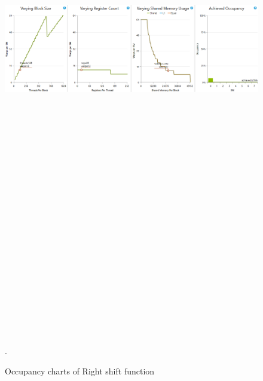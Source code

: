 \documentclass[oneside,openright,12pt,final,en]{mgr}
\begin{document}
\begin{figure}[H]
	\centering
	\includegraphics[width=\textwidth, height=26cm,keepaspectratio]{rightshift_occupancy_charts}.
	\caption{Occupancy charts of Right shift function}
	\label{fig:rightshift_occupancy_charts}
\end{figure}
\end{document}
